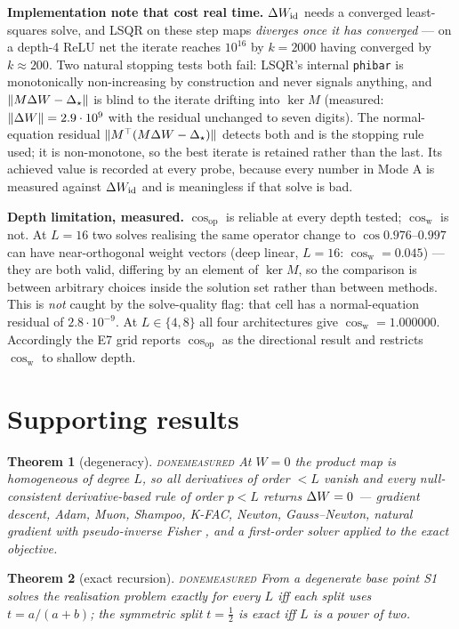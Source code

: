 \documentclass{article}
\newcommand{\OK}{{\color{green!50!black}\textsc{done}}}
\newcommand{\RUN}{{\color{blue!70!black}\textsc{measured}}}
\newcommand{\NOTE}[1]{{\color{gray}\small #1}}
\theoremstyle{plain}\newtheorem{theorem}{Theorem}\newtheorem{lemma}[theorem]{Lemma}
\theoremstyle{definition}\newtheorem{definition}[theorem]{Definition}
\newcommand{\Dstar}{\Delta_\star}\newcommand{\Lam}{\Lambda}
\begin{document}
\NOTE{\textbf{Implementation note that cost real time.} $\Delta W_{\mathrm{id}}$ needs a converged
least-squares solve, and LSQR on these step maps \emph{diverges once it has converged} --- on a
depth-4 ReLU net the iterate reaches $10^{16}$ by $k{=}2000$ having converged by $k{\approx}200$.
Two natural stopping tests both fail: LSQR's internal \texttt{phibar} is monotonically
non-increasing by construction and never signals anything, and $\|M\dW-\Dstar\|$ is blind to the
iterate drifting into $\ker M$ (measured: $\|\Delta W\|=2.9\cdot10^9$ with the residual unchanged to
seven digits). The normal-equation residual $\|M^\top(M\dW-\Dstar)\|$ detects both and is the
stopping rule used; it is non-monotone, so the best iterate is retained rather than the last. Its
achieved value is recorded at every probe, because every number in Mode A is measured against
$\Delta W_{\mathrm{id}}$ and is meaningless if that solve is bad.}

\NOTE{\textbf{Depth limitation, measured.} $\cos_{\mathrm{op}}$ is reliable at every depth tested;
$\cos_{\mathrm{w}}$ is not. At $L{=}16$ two solves realising the same operator change to
$\cos 0.976$--$0.997$ can have near-orthogonal weight vectors (deep linear, $L{=}16$:
$\cos_{\mathrm{w}}=0.045$) --- they are both valid, differing by an element of $\ker M$, so the
comparison is between arbitrary choices inside the solution set rather than between methods. This
is \emph{not} caught by the solve-quality flag: that cell has a normal-equation residual of
$2.8\cdot10^{-9}$. At $L\in\{4,8\}$ all four architectures give $\cos_{\mathrm{w}}=1.000000$.
Accordingly the E7 grid reports $\cos_{\mathrm{op}}$ as the directional result and restricts
$\cos_{\mathrm{w}}$ to shallow depth.}

\section{Supporting results}\label{sec:thms}

\begin{theorem}[degeneracy]\label{thm:degen}\OK{}\RUN{}
At $W=0$ the product map is homogeneous of degree $L$, so all derivatives of order $<L$ vanish and
every null-consistent derivative-based rule of order $p<L$ returns $\Delta W=0$ --- gradient descent,
Adam, Muon, Shampoo, K-FAC, Newton, Gauss--Newton, natural gradient with pseudo-inverse Fisher
\cite{bernacchia2018exact}, and a first-order solver applied to the exact objective.
\end{theorem}

\begin{theorem}[exact recursion]\label{thm:exact}\OK{}\RUN{}
From a degenerate base point S1 solves the realisation problem exactly for every $L$ iff each
split uses $t=a/(a+b)$; the symmetric split $t=\tfrac12$ is exact iff $L$ is a power of two.
\end{theorem}
\end{document}
